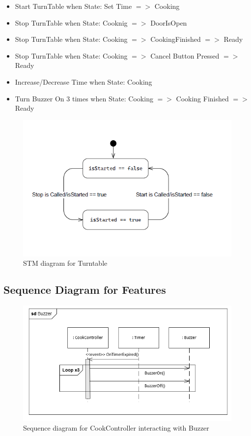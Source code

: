\begin{itemize}
  \item Start TurnTable when State: Set Time $=>$ Cooking
  \item Stop TurnTable when State: Cooknig $=>$ DoorIsOpen
  \item Stop TurnTable when State: Cooking $=>$ CookingFinished $=>$ Ready
  \item Stop TurnTable when State: Cooking $=>$ Cancel Button Pressed $=>$ Ready
  \item Increase/Decrease Time when State: Cooking
  \item Turn Buzzer On 3 times when State: Cooking $=>$ Cooking Finished $=>$ Ready 
\end{itemize}

\begin{figure}[h]
  \centering
  \includegraphics[scale=0.6]{02-Body/Image/TurntableSTM.PNG}
  \caption{STM diagram for Turntable}%
  \label{fig:TurntableSTM}
\end{figure}

\subsection{Sequence Diagram for Features}
\begin{figure}[h]
  \centering
  \includegraphics[scale=0.6]{02-Body/Image/BuzzerSEQ.PNG}
  \caption{Sequence diagram for CookController interacting with Buzzer}%
  \label{fig:BuzzerSeq}
\end{figure}

